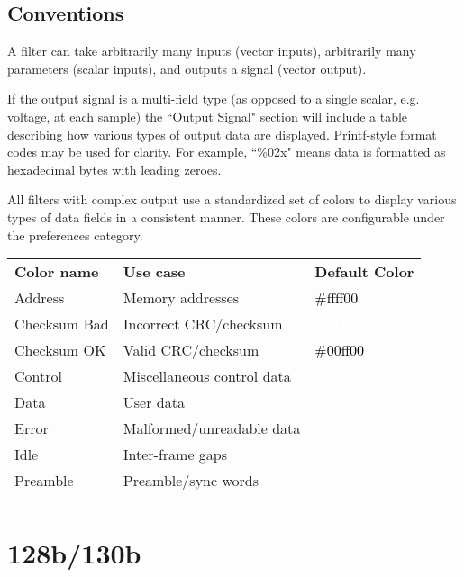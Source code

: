 \subsection{Conventions}

A filter can take arbitrarily many inputs (vector inputs), arbitrarily many parameters (scalar inputs), and outputs a
signal (vector output).

If the output signal is a multi-field type (as opposed to a single scalar, e.g. voltage, at each sample) the
``Output Signal" section will include a table describing how various types of output data are displayed. Printf-style
format codes may be used for clarity. For example, ``\%02x" means data is formatted as hexadecimal bytes with leading
zeroes.

All filters with complex output use a standardized set of colors to display various types of data fields in a
consistent manner. These colors are configurable under the  preferences category.

\begin{tabularx}{16cm}{llX}
\thickhline
\textbf{Color name} & \textbf{Use case} & \textbf{Default Color} \\
\thickhline
Address & Memory addresses & \cellcolor{address}\textcolor{black}{\#ffff00} \\
\thinhline
Checksum Bad & Incorrect CRC/checksum & \cellcolor{checksumbad}\textcolor{white}{\#ff0000} \\
\thinhline
Checksum OK & Valid CRC/checksum & \cellcolor{checksumok}\textcolor{black}{\#00ff00} \\
\thinhline
Control & Miscellaneous control data & \cellcolor{control}\textcolor{white}{\#c000a0} \\
\thinhline
Data & User data & \cellcolor{data}\textcolor{white}{\#336699} \\
\thinhline
Error & Malformed/unreadable data & \cellcolor{error}\textcolor{white}{\#ff0000} \\
\thinhline
Idle & Inter-frame gaps & \cellcolor{idle}\textcolor{white}{\#404040} \\
\thinhline
Preamble & Preamble/sync words & \cellcolor{preamble}\textcolor{white}{\#808080} \\
\thickhline
\end{tabularx}

\pagebreak
\section{128b/130b}
\label{filter:128b130b}

